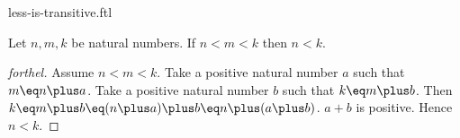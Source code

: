 \documentclass{stex}
\begin{document}
\begin{smodule}{less-is-transitive.ftl}


\begin{proposition}[forthel,id=LessIsTransitiveProp]
  Let $n, m, k$ be natural numbers.
  If $n \less m \less k$ then $n \less k$.
\end{proposition}
\begin{proof}[forthel]
  Assume $n \less m \less k$.
  Take a positive natural number $a$ such that $m \eq n \plus a$.
  Take a positive natural number $b$ such that $k \eq m \plus b$.
  Then $k
    \eq m \plus b
    \eq (n \plus a) \plus b
    \eq n \plus (a \plus b)$.
  $a \plus b$ is positive.
  Hence $n \less k$.
\end{proof}

\end{smodule}
\end{document}
